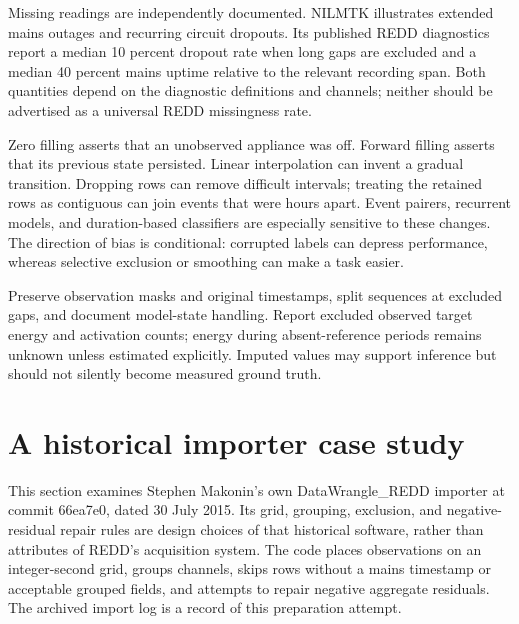 \documentclass[11pt,letterpaper]{article}
\begin{document}
Missing readings are independently documented. NILMTK illustrates extended mains outages and recurring circuit dropouts. Its published REDD diagnostics report a median 10 percent dropout rate when long gaps are excluded and a median 40 percent mains uptime relative to the relevant recording span. Both quantities depend on the diagnostic definitions and channels; neither should be advertised as a universal REDD missingness rate. \cite{ref2}

Zero filling asserts that an unobserved appliance was off. Forward filling asserts that its previous state persisted. Linear interpolation can invent a gradual transition. Dropping rows can remove difficult intervals; treating the retained rows as contiguous can join events that were hours apart. Event pairers, recurrent models, and duration-based classifiers are especially sensitive to these changes. The direction of bias is conditional: corrupted labels can depress performance, whereas selective exclusion or smoothing can make a task easier.

Preserve observation masks and original timestamps, split sequences at excluded gaps, and document model-state handling. Report excluded observed target energy and activation counts; energy during absent-reference periods remains unknown unless estimated explicitly. Imputed values may support inference but should not silently become measured ground truth.

\section{A historical importer case study}
This section examines Stephen Makonin's own DataWrangle\_REDD importer at commit 66ea7e0, dated 30 July 2015. Its grid, grouping, exclusion, and negative-residual repair rules are design choices of that historical software, rather than attributes of REDD's acquisition system. The code places observations on an integer-second grid, groups channels, skips rows without a mains timestamp or acceptable grouped fields, and attempts to repair negative aggregate residuals. The archived import log is a record of this preparation attempt. \cite{ref4,ref5}
\end{document}
